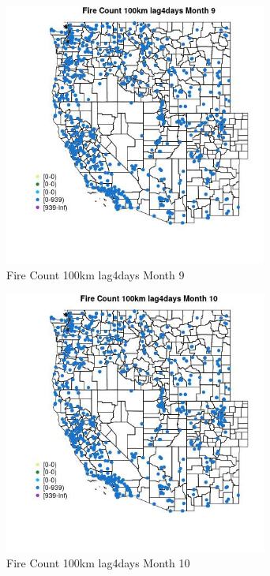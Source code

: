 \begin{figure} 
\centering  
\includegraphics[width=0.77\textwidth]{Code_Outputs/Report_ML_input_PM25_Step4_part_e_de_duplicated_aves_compiled_2019-05-21wNAs_MapObsMo9Fire_Count_100km_lag4days.jpg} 
\caption{\label{fig:Report_ML_input_PM25_Step4_part_e_de_duplicated_aves_compiled_2019-05-21wNAsMapObsMo9Fire_Count_100km_lag4days}Fire Count 100km lag4days Month 9} 
\end{figure} 
 

\begin{figure} 
\centering  
\includegraphics[width=0.77\textwidth]{Code_Outputs/Report_ML_input_PM25_Step4_part_e_de_duplicated_aves_compiled_2019-05-21wNAs_MapObsMo10Fire_Count_100km_lag4days.jpg} 
\caption{\label{fig:Report_ML_input_PM25_Step4_part_e_de_duplicated_aves_compiled_2019-05-21wNAsMapObsMo10Fire_Count_100km_lag4days}Fire Count 100km lag4days Month 10} 
\end{figure} 
 

